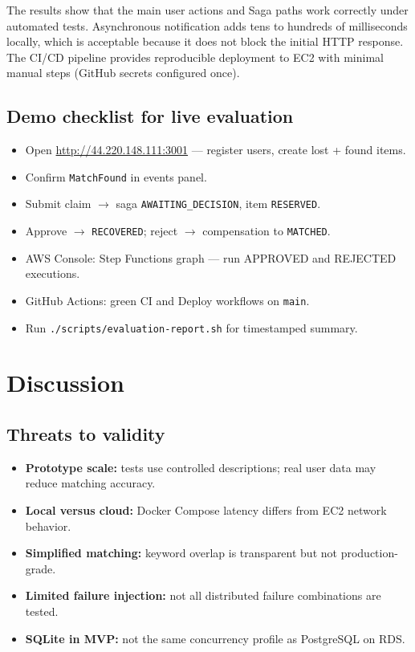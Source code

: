 \documentclass[11pt,a4paper]{article}
\begin{document}
The results show that the main user actions and Saga paths work correctly under automated tests.
Asynchronous notification adds tens to hundreds of milliseconds locally, which is acceptable because
it does not block the initial HTTP response. The CI/CD pipeline provides reproducible deployment
to EC2 with minimal manual steps (GitHub secrets configured once).

\subsection{Demo checklist for live evaluation}

\begin{itemize}
    \item Open \url{http://44.220.148.111:3001} --- register users, create lost + found items.
    \item Confirm \texttt{MatchFound} in events panel.
    \item Submit claim $\rightarrow$ saga \texttt{AWAITING\_DECISION}, item \texttt{RESERVED}.
    \item Approve $\rightarrow$ \texttt{RECOVERED}; reject $\rightarrow$ compensation to \texttt{MATCHED}.
    \item AWS Console: Step Functions graph --- run APPROVED and REJECTED executions.
    \item GitHub Actions: green CI and Deploy workflows on \texttt{main}.
    \item Run \texttt{./scripts/evaluation-report.sh} for timestamped summary.
\end{itemize}

\newpage

\section{Discussion}

\subsection{Threats to validity}

\begin{itemize}
    \item \textbf{Prototype scale:} tests use controlled descriptions; real user data may reduce matching accuracy.
    \item \textbf{Local versus cloud:} Docker Compose latency differs from EC2 network behavior.
    \item \textbf{Simplified matching:} keyword overlap is transparent but not production-grade.
    \item \textbf{Limited failure injection:} not all distributed failure combinations are tested.
    \item \textbf{SQLite in MVP:} not the same concurrency profile as PostgreSQL on RDS.
\end{itemize}
\end{document}
